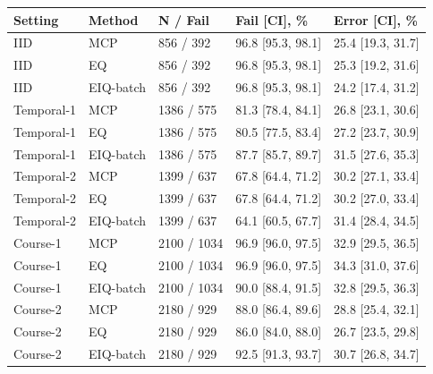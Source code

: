 \begin{tabular}{lllll}
\toprule
Setting & Method & N / Fail & Fail [CI], \% & Error [CI], \%\\
\midrule
IID & MCP & 856 / 392 & 96.8 [95.3, 98.1] & 25.4 [19.3, 31.7]\\
IID & EQ & 856 / 392 & 96.8 [95.3, 98.1] & 25.3 [19.2, 31.6]\\
IID & EIQ-batch & 856 / 392 & 96.8 [95.3, 98.1] & 24.2 [17.4, 31.2]\\
Temporal-1 & MCP & 1386 / 575 & 81.3 [78.4, 84.1] & 26.8 [23.1, 30.6]\\
Temporal-1 & EQ & 1386 / 575 & 80.5 [77.5, 83.4] & 27.2 [23.7, 30.9]\\
Temporal-1 & EIQ-batch & 1386 / 575 & 87.7 [85.7, 89.7] & 31.5 [27.6, 35.3]\\
Temporal-2 & MCP & 1399 / 637 & 67.8 [64.4, 71.2] & 30.2 [27.1, 33.4]\\
Temporal-2 & EQ & 1399 / 637 & 67.8 [64.4, 71.2] & 30.2 [27.0, 33.4]\\
Temporal-2 & EIQ-batch & 1399 / 637 & 64.1 [60.5, 67.7] & 31.4 [28.4, 34.5]\\
Course-1 & MCP & 2100 / 1034 & 96.9 [96.0, 97.5] & 32.9 [29.5, 36.5]\\
Course-1 & EQ & 2100 / 1034 & 96.9 [96.0, 97.5] & 34.3 [31.0, 37.6]\\
Course-1 & EIQ-batch & 2100 / 1034 & 90.0 [88.4, 91.5] & 32.8 [29.5, 36.3]\\
Course-2 & MCP & 2180 / 929 & 88.0 [86.4, 89.6] & 28.8 [25.4, 32.1]\\
Course-2 & EQ & 2180 / 929 & 86.0 [84.0, 88.0] & 26.7 [23.5, 29.8]\\
Course-2 & EIQ-batch & 2180 / 929 & 92.5 [91.3, 93.7] & 30.7 [26.8, 34.7]\\
\bottomrule
\end{tabular}